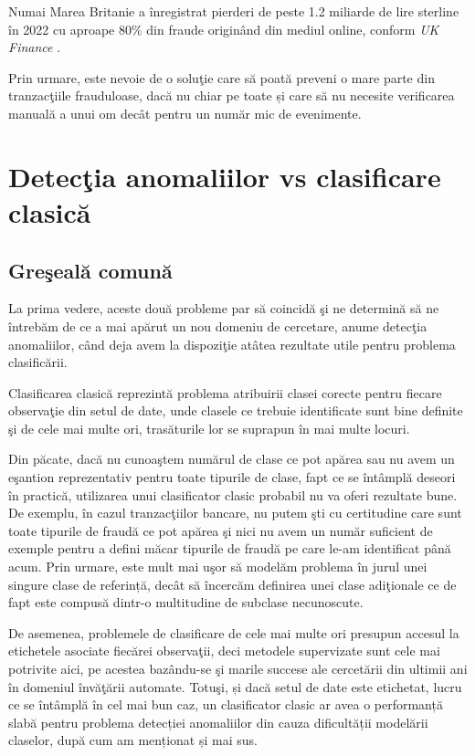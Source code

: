 Numai Marea Britanie a înregistrat pierderi de peste 1.2 
miliarde de lire sterline în 2022 cu aproape 80\% din fraude
originând din mediul online, conform \textit{UK Finance}
\cite{uk-finance}.

Prin urmare, este nevoie de o soluţie care să poată 
preveni o mare parte din tranzacţiile frauduloase, dacă
nu chiar pe toate și care să nu necesite verificarea manuală
a unui om decât pentru un număr mic de evenimente.


\section{Detecţia anomaliilor vs clasificare clasică}

\subsection{Greşeală comună}

La prima vedere, aceste două probleme par să coincidă şi ne determină
să ne întrebăm de ce a mai apărut un nou domeniu de cercetare, anume detecţia
anomaliilor, când deja avem la dispoziţie atâtea rezultate utile pentru 
problema clasificării. 

Clasificarea clasică reprezintă problema 
atribuirii clasei corecte pentru fiecare observaţie din setul de date,
unde clasele ce trebuie identificate sunt bine definite şi de cele mai
multe ori, trasăturile lor se suprapun în mai multe locuri.

Din păcate, dacă nu cunoaştem numărul de clase ce pot apărea 
sau nu avem un eşantion reprezentativ pentru toate tipurile de clase, fapt ce se 
întâmplă deseori în practică, utilizarea unui clasificator clasic probabil 
nu va oferi rezultate bune. De exemplu, 
în cazul tranzacţiilor bancare, nu putem şti cu certitudine care sunt toate 
tipurile de fraudă ce pot apărea şi nici nu avem un număr suficient de exemple 
pentru a defini măcar tipurile de fraudă pe care le-am identificat până acum.
Prin urmare, este mult mai uşor să modelăm problema în jurul unei singure clase 
de referință, decât să încercăm definirea unei clase adiţionale ce de fapt 
este compusă dintr-o multitudine de subclase necunoscute.

De asemenea, problemele de clasificare de cele mai multe ori presupun 
accesul la etichetele asociate fiecărei observaţii, deci metodele 
supervizate sunt cele mai potrivite aici, pe acestea bazându-se
şi marile succese ale cercetării din ultimii ani în domeniul învăţării automate.
Totuşi, și dacă setul de date 
este etichetat, lucru ce se întâmplă în cel mai bun caz, un clasificator 
clasic ar avea o performanță slabă pentru problema detecției anomaliilor
din cauza dificultății modelării claselor, după cum am menționat și mai sus.

